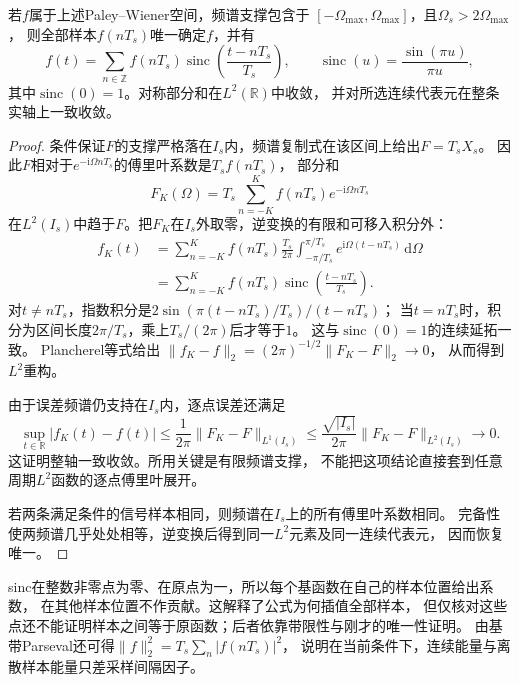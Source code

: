 \begin{theorem}[带限信号的采样重构]
  \label{thm:signal-analysis-sampling}
  若$f$属于上述Paley--Wiener空间，频谱支撑包含于
  $[-\Omega_{\max},\Omega_{\max}]$，且$\Omega_s>2\Omega_{\max}$，
  则全部样本$f(nT_s)$唯一确定$f$，并有
  \begin{equation}
    f(t)=\sum_{n\in\mathbb Z}f(nT_s)
    \operatorname{sinc}\left(\frac{t-nT_s}{T_s}\right),
    \qquad \operatorname{sinc}(u)=\frac{\sin(\pi u)}{\pi u},
    \label{eq:signal-analysis-sinc-reconstruction}
  \end{equation}
  其中$\operatorname{sinc}(0)=1$。对称部分和在$L^2(\mathbb R)$中收敛，
  并对所选连续代表元在整条实轴上一致收敛。
\end{theorem}
\begin{proof}
  条件保证$F$的支撑严格落在$I_s$内，频谱复制式在该区间上给出$F=T_sX_s$。
  因此$F$相对于$e^{-\mathrm i\Omega nT_s}$的傅里叶系数是$T_sf(nT_s)$，
  部分和
  \[
    F_K(\Omega)=T_s\sum_{n=-K}^{K}f(nT_s)e^{-\mathrm i\Omega nT_s}
  \]
  在$L^2(I_s)$中趋于$F$。把$F_K$在$I_s$外取零，逆变换的有限和可移入积分外：
  \begin{align*}
    f_K(t)
    &=\sum_{n=-K}^{K}f(nT_s)\frac{T_s}{2\pi}
      \int_{-\pi/T_s}^{\pi/T_s}e^{\mathrm i\Omega(t-nT_s)}\,\mathrm d\Omega\\
    &=\sum_{n=-K}^{K}f(nT_s)
      \operatorname{sinc}\left(\frac{t-nT_s}{T_s}\right).
  \end{align*}
  对$t\neq nT_s$，指数积分是$2\sin(\pi(t-nT_s)/T_s)/(t-nT_s)$；
  当$t=nT_s$时，积分为区间长度$2\pi/T_s$，乘上$T_s/(2\pi)$后才等于$1$。
  这与$\operatorname{sinc}(0)=1$的连续延拓一致。
  Plancherel等式给出
  $\|f_K-f\|_2=(2\pi)^{-1/2}\|F_K-F\|_2\to0$，
  从而得到$L^2$重构。

  由于误差频谱仍支持在$I_s$内，逐点误差还满足
  \[
    \sup_{t\in\mathbb R}|f_K(t)-f(t)|
    \leq\frac1{2\pi}\|F_K-F\|_{L^1(I_s)}
    \leq\frac{\sqrt{|I_s|}}{2\pi}\|F_K-F\|_{L^2(I_s)}
    \longrightarrow0.
  \]
  这证明整轴一致收敛。所用关键是有限频谱支撑，
  不能把这项结论直接套到任意周期$L^2$函数的逐点傅里叶展开。

  若两条满足条件的信号样本相同，则频谱在$I_s$上的所有傅里叶系数相同。
  完备性使两频谱几乎处处相等，逆变换后得到同一$L^2$元素及同一连续代表元，
  因而恢复唯一。
\end{proof}

sinc在整数非零点为零、在原点为一，所以每个基函数在自己的样本位置给出系数，
在其他样本位置不作贡献。这解释了公式为何插值全部样本，
但仅核对这些点还不能证明样本之间等于原函数；后者依靠带限性与刚才的唯一性证明。
由基带Parseval还可得$\|f\|_2^2=T_s\sum_n|f(nT_s)|^2$，
说明在当前条件下，连续能量与离散样本能量只差采样间隔因子。

